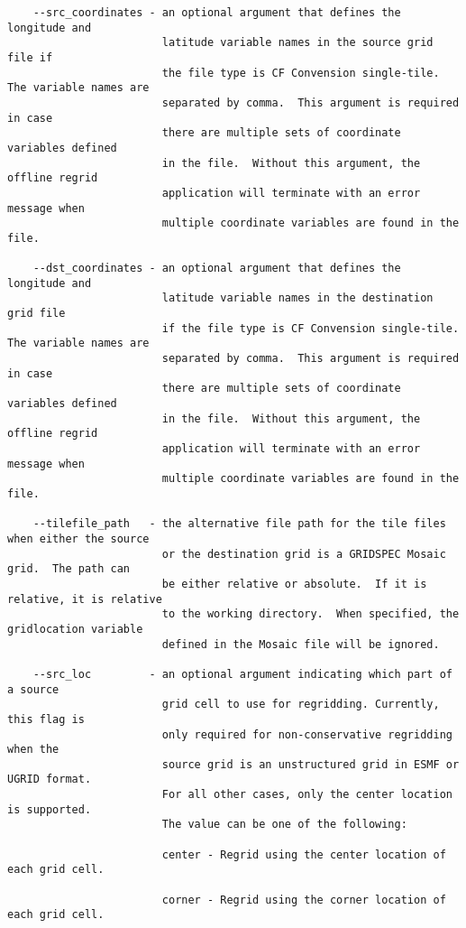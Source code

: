 \begin{verbatim}
    --src_coordinates - an optional argument that defines the longitude and
                        latitude variable names in the source grid file if
                        the file type is CF Convension single-tile.  The variable names are
                        separated by comma.  This argument is required in case
                        there are multiple sets of coordinate variables defined
                        in the file.  Without this argument, the offline regrid
                        application will terminate with an error message when
                        multiple coordinate variables are found in the file.

    --dst_coordinates - an optional argument that defines the longitude and
                        latitude variable names in the destination grid file
                        if the file type is CF Convension single-tile.  The variable names are
                        separated by comma.  This argument is required in case
                        there are multiple sets of coordinate variables defined
                        in the file.  Without this argument, the offline regrid
                        application will terminate with an error message when
                        multiple coordinate variables are found in the file.

    --tilefile_path   - the alternative file path for the tile files when either the source
                        or the destination grid is a GRIDSPEC Mosaic grid.  The path can
                        be either relative or absolute.  If it is relative, it is relative
                        to the working directory.  When specified, the gridlocation variable
                        defined in the Mosaic file will be ignored. 
                
    --src_loc         - an optional argument indicating which part of a source
                        grid cell to use for regridding. Currently, this flag is 
                        only required for non-conservative regridding when the 
                        source grid is an unstructured grid in ESMF or UGRID format.
                        For all other cases, only the center location is supported.
                        The value can be one of the following:

                        center - Regrid using the center location of each grid cell.

                        corner - Regrid using the corner location of each grid cell.


\end{verbatim}
